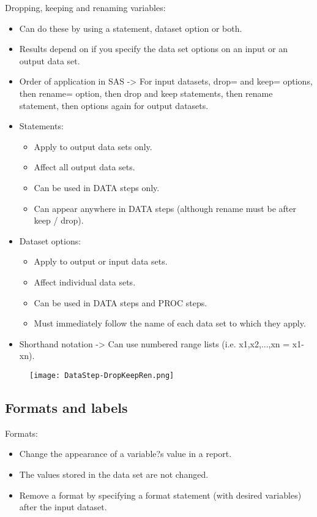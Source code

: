 \documentclass[11pt, oneside]{article}
\begin{document}
Dropping, keeping and renaming variables:
\begin{itemize}
\item Can do these by using a statement, dataset option or both.
\item Results depend on if you specify the data set options on an input or an output data set.
\item Order of application in SAS -> For input datasets, drop= and keep= options, then rename= option, then drop and keep statements, then rename statement, then options again for output datasets.
\item Statements:
	\begin{itemize}
	\item Apply to output data sets only.
	\item Affect all output data sets.
	\item Can be used in DATA steps only.
	\item Can appear anywhere in DATA steps (although rename must be after keep / drop).
	\end{itemize}
\item Dataset options:
	\begin{itemize}
	\item Apply to output or input data sets.
	\item Affect individual data sets.
	\item Can be used in DATA steps and PROC steps.
	\item Must immediately follow the name of each data set to which they apply.
	\end{itemize}
\item Shorthand notation -> Can use numbered range lists (i.e. x1,x2,...,xn = x1-xn).
\end{itemize}


\begin{figure}[H]
\texttt{[image: DataStep-DropKeepRen.png]}
\end{figure}
	
\subsection{Formats and labels}

Formats:
\begin{itemize}
	\item Change the appearance of a variable?s value in a report.
	\item The values stored in the data set are not changed.
	\item Remove a format by specifying a format statement (with desired variables) after the input dataset.
\end{itemize}
\end{document}
